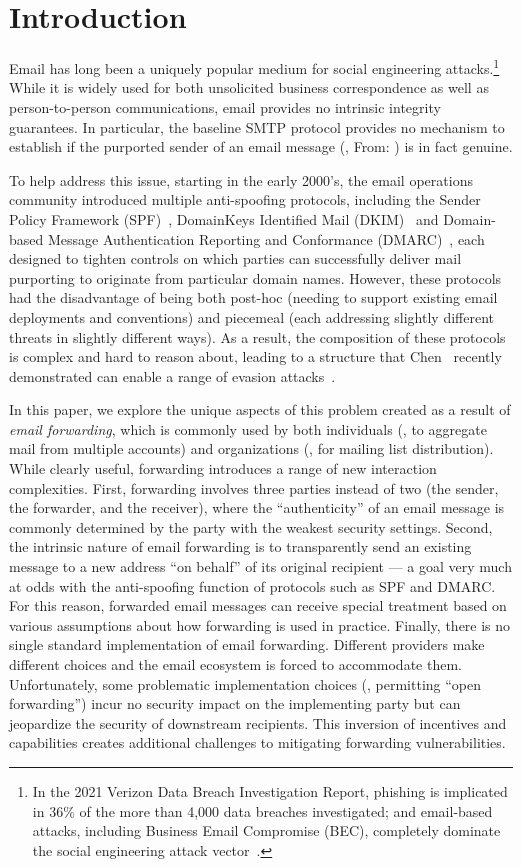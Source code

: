 \section{Introduction}
Email has long been a uniquely popular medium for social engineering
attacks.\footnote{In the 2021 Verizon Data Breach Investigation
  Report, phishing is implicated in 36\% of the more than 4,000 data
  breaches investigated; and email-based attacks, including Business
  Email Compromise (BEC), completely dominate the social engineering
  attack vector~\cite{dbir2021}.}  While it is widely used for
both unsolicited business correspondence as well as person-to-person
communications, email provides no intrinsic integrity guarantees.  In
particular, the baseline SMTP protocol provides no mechanism to
establish if the purported sender of an email message (\eg, From:
) is in fact genuine.

To help address this issue, starting in the early 2000's, the email
operations community introduced multiple anti-spoofing protocols,
including the Sender Policy Framework (SPF)~\cite{rfc7208}, DomainKeys
Identified Mail
(DKIM)~\cite{rfc6376} and Domain-based Message Authentication
Reporting and Conformance (DMARC)~\cite{rfc7489}, each designed to
tighten controls on which parties can successfully deliver
mail purporting to originate from particular domain names.  However,
these protocols had the disadvantage of being both post-hoc (needing
to support existing email deployments and conventions) and piecemeal
(each addressing slightly different threats in slightly different
ways).  As a result, the composition of these protocols is complex and
hard to reason about, leading to a structure that Chen \etal\ recently
demonstrated can enable a range of evasion
attacks~\cite{chen2020composition}.

In this paper, we explore the unique aspects of this problem created
as a result of \emph{email forwarding}, which is commonly used by both
individuals (\ie, to aggregate mail from multiple accounts) and
organizations (\ie, for mailing list distribution).  While clearly
useful, forwarding introduces a range of new interaction
complexities. First, forwarding involves three parties instead of two
(the sender, the forwarder, and the receiver), where the
``authenticity'' of an email message is commonly determined by the party with
the weakest security settings.  Second, the intrinsic nature of email
forwarding is to transparently send an existing message to a new
address ``on behalf'' of its original recipient --- a goal very much
at odds with the anti-spoofing function of protocols such as SPF and
DMARC.  For this reason, forwarded email messages can receive special
treatment based on various assumptions about how forwarding is used in
practice.  Finally, there is no single standard implementation of
email forwarding. Different providers make different choices and the
email ecosystem is forced to accommodate them.  Unfortunately, some
problematic implementation choices (\eg, permitting ``open
forwarding'') incur no security impact on the implementing party but
can jeopardize the security of downstream recipients.  This inversion of
incentives and capabilities creates additional challenges to
mitigating forwarding vulnerabilities.

